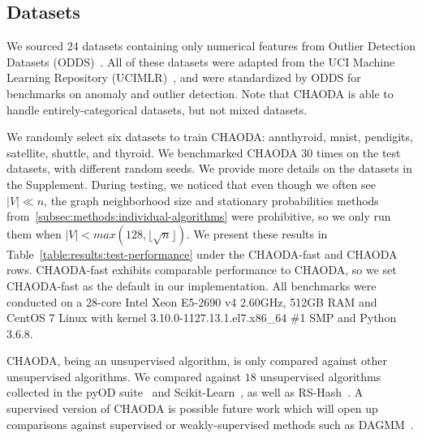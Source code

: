 \subsection{Datasets}
\label{subsec:methods:datasets}

We sourced 24 datasets containing only numerical features from Outlier Detection Datasets (ODDS)~\cite{rayana2016odds}.
All of these datasets were adapted from the UCI Machine Learning Repository (UCIMLR)~\cite{UCIMLR}, and were standardized by ODDS for benchmarks on anomaly and outlier detection.
Note that CHAODA is able to handle entirely-categorical datasets, but not mixed datasets.

We randomly select six datasets to train CHAODA: annthyroid, mnist, pendigits, satellite, shuttle, and thyroid.
We benchmarked CHAODA 30 times on the test datasets, with different random seeds.
We provide more details on the datasets in the Supplement.
During testing, we noticed that even though we often see $|V| \ll n $, the graph neighborhood size and stationary probabilities methods from~\ref{subsec:methods:individual-algorithms} were prohibitive, so we only run them when $|V| < max(128, \lfloor \sqrt n \rfloor)$.
We present these results in Table~\ref{table:results:test-performance} under the CHAODA-fast and CHAODA rows.
CHAODA-fast exhibits comparable performance to CHAODA, so we set CHAODA-fast as the default in our implementation.
All benchmarks were conducted on a 28-core Intel Xeon E5-2690 v4 2.60GHz, 512GB RAM and CentOS 7 Linux with kernel 3.10.0-1127.13.1.el7.x86\_64 \#1 SMP and Python 3.6.8.


CHAODA, being an unsupervised algorithm, is only compared against other unsupervised algorithms.
We compared against $18$ unsupervised algorithms collected in the pyOD suite~\cite{zhao2019pyod} and Scikit-Learn~\cite{pedregosa2011scikit}, as well as RS-Hash~\cite{sathe2016subspace}.
A supervised version of CHAODA is possible future work which will open up comparisons against supervised or weakly-supervised methods such as DAGMM~\cite{zong2018deep}.

